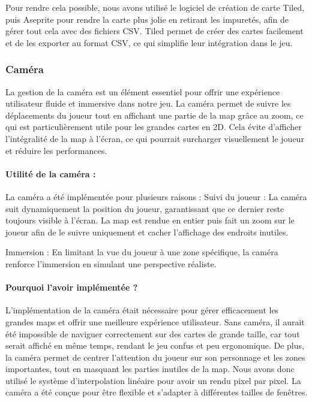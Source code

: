 \documentclass[12pt,a4paper, twoside]{article}
\begin{document}
    Pour rendre cela possible, nous avons utilisé le logiciel de création de carte Tiled, puis Aseprite pour rendre la carte plus jolie en retirant les impuretés, afin de gérer tout cela avec des fichiers CSV.
    Tiled permet de créer des cartes facilement et de les exporter au format CSV, ce qui simplifie leur intégration dans le jeu.
    \subsubsection{Caméra}
    La gestion de la caméra est un élément essentiel pour offrir une expérience utilisateur fluide et immersive dans notre jeu. La caméra permet de suivre les déplacements du joueur tout en affichant une partie de la map grâce au zoom, ce qui est particulièrement utile pour les grandes cartes en 2D. Cela évite d'afficher l'intégralité de la map à l'écran, ce qui pourrait surcharger visuellement le joueur et réduire les performances.
    \paragraph{Utilité de la caméra :} La caméra a été implémentée pour plusieurs raisons :
    Suivi du joueur : La caméra suit dynamiquement la position du joueur, garantissant que ce dernier reste toujours visible à l'écran.
    La map est rendue en entier puis fait un zoom sur le joueur afin de le suivre uniquement et cacher l'affichage des endroits inutiles.

    Immersion : En limitant la vue du joueur à une zone spécifique, la caméra renforce l'immersion en simulant une perspective réaliste.

    \paragraph{Pourquoi l'avoir implémentée ?}

    L'implémentation de la caméra était nécessaire pour gérer efficacement les grandes maps et offrir une meilleure expérience utilisateur. Sans caméra, il aurait été impossible de naviguer correctement sur des cartes de grande taille, car tout serait affiché en même temps, rendant le jeu confus et peu ergonomique. De plus, la caméra permet de centrer l'attention du joueur sur son personnage et les zones importantes, tout en masquant les parties inutiles de la map.
    Nous avons donc utilisé le système d'interpolation linéaire pour avoir un rendu pixel par pixel.
    La caméra a été conçue pour être flexible et s'adapter à différentes tailles de fenêtres.
\end{document}

